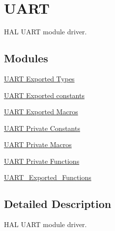 \hypertarget{group___u_a_r_t}{}\section{U\+A\+RT}
\label{group___u_a_r_t}


H\+AL U\+A\+RT module driver.  


\subsection*{Modules}
\begin{DoxyCompactItemize}
\item 
\hyperlink{group___u_a_r_t___exported___types}{U\+A\+R\+T Exported Types}
\item 
\hyperlink{group___u_a_r_t___exported___constants}{U\+A\+R\+T Exported constants}
\item 
\hyperlink{group___u_a_r_t___exported___macros}{U\+A\+R\+T Exported Macros}
\item 
\hyperlink{group___u_a_r_t___private___constants}{U\+A\+R\+T Private Constants}
\item 
\hyperlink{group___u_a_r_t___private___macros}{U\+A\+R\+T Private Macros}
\item 
\hyperlink{group___u_a_r_t___private___functions}{U\+A\+R\+T Private Functions}
\item 
\hyperlink{group___u_a_r_t___exported___functions}{U\+A\+R\+T\+\_\+\+Exported\+\_\+\+Functions}
\end{DoxyCompactItemize}


\subsection{Detailed Description}
H\+AL U\+A\+RT module driver. 

